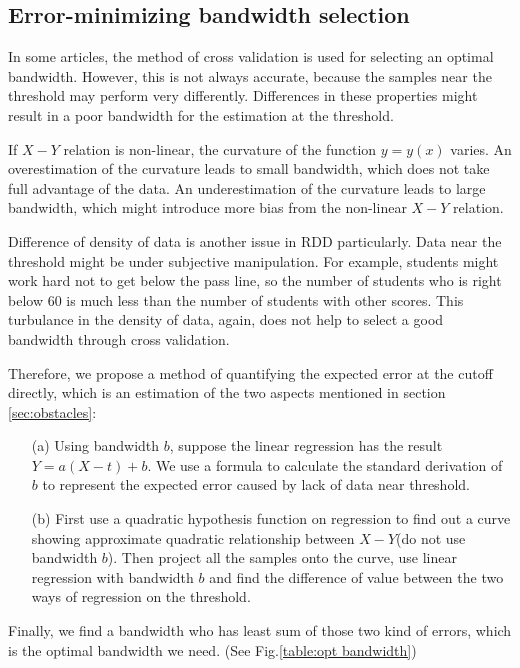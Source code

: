 \documentclass[a4 paper,12pt]{article}
\begin{document}
\subsection{Error-minimizing bandwidth selection}

In some articles, the method of cross validation is used for selecting an optimal bandwidth.
However, this is not always accurate,
because the samples near the threshold may perform very differently.
Differences in these properties might result in a poor bandwidth for the estimation at the threshold.

If $X-Y$ relation is non-linear,
the curvature of the function $y=y(x)$ varies.
An overestimation of the curvature leads to small bandwidth,
which does not take full advantage of the data.
An underestimation of the curvature leads to large bandwidth,
which might introduce more bias from the non-linear $X-Y$ relation.

Difference of density of data is another issue in RDD particularly.
Data near the threshold might be under subjective manipulation.
For example, students might work hard not to get below the pass line,
so the number of students who is right below $60$ is much less than the number of students with other scores.
This turbulance in the density of data, again, does not help to select a good bandwidth through cross validation.

Therefore, we propose a method of quantifying the expected error at the cutoff directly, which is an estimation of the two aspects mentioned in section \ref{sec:obstacles}:

\begin{enumerate}
   \item[(a)] Using bandwidth $b$, suppose the linear regression has the result $Y=a(X-t)+b$. We use a formula to calculate the standard derivation of $b$ to represent the expected error caused by lack of data near threshold.
   \item[(b)] First use a quadratic hypothesis function on regression to find out a curve showing approximate quadratic relationship between $X-Y$(do not use bandwidth $b$). Then project all the samples onto the curve, use linear regression with bandwidth $b$ and find the difference of value between the two ways of regression on the threshold.
\end{enumerate}

Finally, we find a bandwidth who has least sum of those two kind of errors, which is the optimal bandwidth we need. (See Fig.\ref{table:opt bandwidth})
\end{document}
